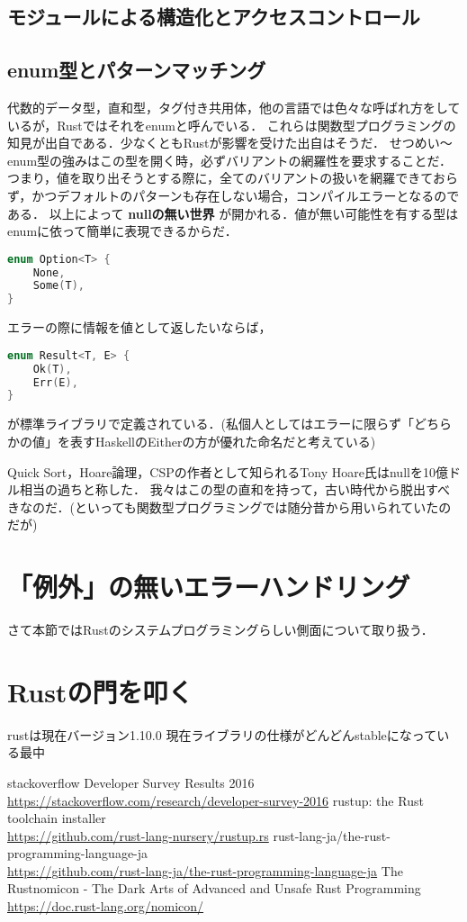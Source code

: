 \subsection{モジュールによる構造化とアクセスコントロール}


\subsection{enum型とパターンマッチング}
代数的データ型，直和型，タグ付き共用体，他の言語では色々な呼ばれ方をしているが，Rustではそれをenumと呼んでいる．
これらは関数型プログラミングの知見が出自である．少なくともRustが影響を受けた出自はそうだ．
せつめい〜
enum型の強みはこの型を開く時，必ずバリアントの網羅性を要求することだ．
つまり，値を取り出そうとする際に，全てのバリアントの扱いを網羅できておらず，かつデフォルトのパターンも存在しない場合，コンパイルエラーとなるのである．
以上によって \textbf{nullの無い世界} が開かれる．値が無い可能性を有する型はenumに依って簡単に表現できるからだ．
\begin{lstlisting}[language={C++},caption=Option型,label=option_t]
enum Option<T> {
    None,
    Some(T),
}
\end{lstlisting}
エラーの際に情報を値として返したいならば，
\begin{lstlisting}[language={C++},caption=Result型,label=result_t]
enum Result<T, E> {
    Ok(T),
    Err(E),
}
\end{lstlisting}
が標準ライブラリで定義されている．(私個人としてはエラーに限らず「どちらかの値」を表すHaskellのEitherの方が優れた命名だと考えている)

Quick Sort，Hoare論理，CSPの作者として知られるTony Hoare氏はnullを10億ドル相当の過ちと称した．
我々はこの型の直和を持って，古い時代から脱出すべきなのだ．(といっても関数型プログラミングでは随分昔から用いられていたのだが)

\section{「例外」の無いエラーハンドリング}
さて本節ではRustのシステムプログラミングらしい側面について取り扱う．

\section{Rustの門を叩く}
rustは現在バージョン1.10.0
現在ライブラリの仕様がどんどんstableになっている最中

\begin{thebibliography}{9}
 stackoverflow Developer Survey Results 2016 \\
  \url{https://stackoverflow.com/research/developer-survey-2016}
 rustup: the Rust toolchain installer \\
  \url{https://github.com/rust-lang-nursery/rustup.rs}
 rust-lang-ja/the-rust-programming-language-ja \\
  \url{https://github.com/rust-lang-ja/the-rust-programming-language-ja}
 The Rustnomicon - The Dark Arts of Advanced and Unsafe Rust Programming \\
  \url{https://doc.rust-lang.org/nomicon/}
\end{thebibliography}
